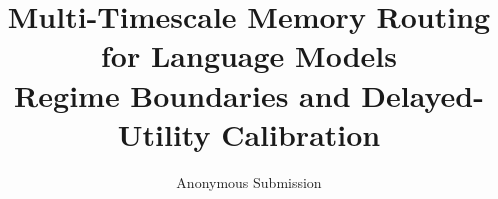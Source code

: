 \documentclass[11pt]{article}
\title{Multi-Timescale Memory Routing for Language Models\\Regime Boundaries and Delayed-Utility Calibration}
\author{Anonymous Submission}
\date{}
\begin{document}
\maketitle

\begin{abstract}

\end{abstract}











\appendix




\end{document}
